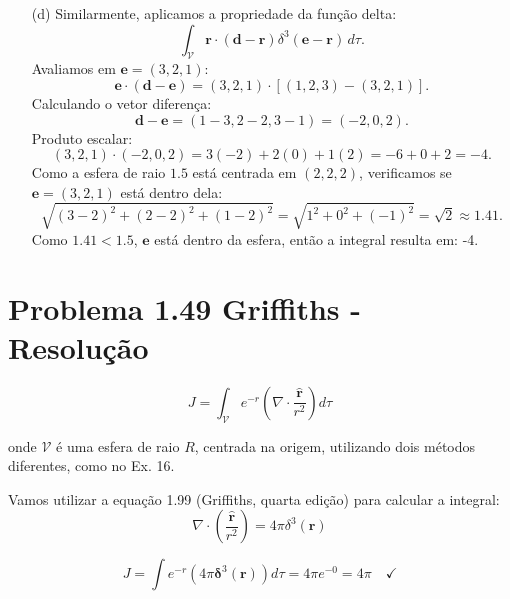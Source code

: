 \documentclass[a4paper,12pt]{article}
\begin{document}
\begin{enumerate}
    \item[(d)] Similarmente, aplicamos a propriedade da função delta:
    \begin{equation}
    \int_{\mathcal{V}} \mathbf{r} \cdot (\mathbf{d} - \mathbf{r}) \delta^3(\mathbf{e} - \mathbf{r}) \, d\tau.
    \end{equation}
    Avaliamos em $\mathbf{e} = (3,2,1)$:
    \begin{equation}
    \mathbf{e} \cdot (\mathbf{d} - \mathbf{e}) = (3,2,1) \cdot [(1,2,3) - (3,2,1)].
    \end{equation}
    Calculando o vetor diferença:
    \begin{equation}
    \mathbf{d} - \mathbf{e} = (1 - 3, 2 - 2, 3 - 1) = (-2,0,2).
    \end{equation}
    Produto escalar:
    \begin{equation}
    (3,2,1) \cdot (-2,0,2) = 3(-2) + 2(0) + 1(2) = -6 + 0 + 2 = -4.
    \end{equation}
    Como a esfera de raio $1.5$ está centrada em $(2,2,2)$, verificamos se $\mathbf{e} = (3,2,1)$ está dentro dela:
    \begin{equation}
    \sqrt{(3-2)^2 + (2-2)^2 + (1-2)^2} = \sqrt{1^2 + 0^2 + (-1)^2} = \sqrt{2} \approx 1.41.
    \end{equation}
    Como $1.41 < 1.5$, $\mathbf{e}$ está dentro da esfera, então a integral resulta em: -4.
\end{enumerate}

\section*{Problema 1.49 Griffiths - Resolu\c{c}\~ao}

\begin{equation}
J = \int_{\mathcal{V}} e^{-r} \left( \nabla \cdot \frac{\hat{\mathbf{r}}}{r^2} \right) d\tau
\end{equation}

onde $\mathcal{V}$ é uma esfera de raio $R$, centrada na origem, utilizando dois métodos diferentes, como no Ex. 16.

Vamos utilizar a equação 1.99 (Griffiths, quarta edição) para calcular a integral:
\begin{equation}
    \nabla\cdot \left(\frac{\hat{\mathbf{r}}}{r^2}\right) = 4\pi \delta^{3}(\mathbf{r})
\end{equation}

\begin{equation}
    J=\int e^{-r}\left(4 \pi \boldsymbol{\delta}^{3}(\mathbf{r})\right) d \tau=4 \pi e^{-0}=4 \pi \quad \checkmark
\end{equation}
\end{document}
